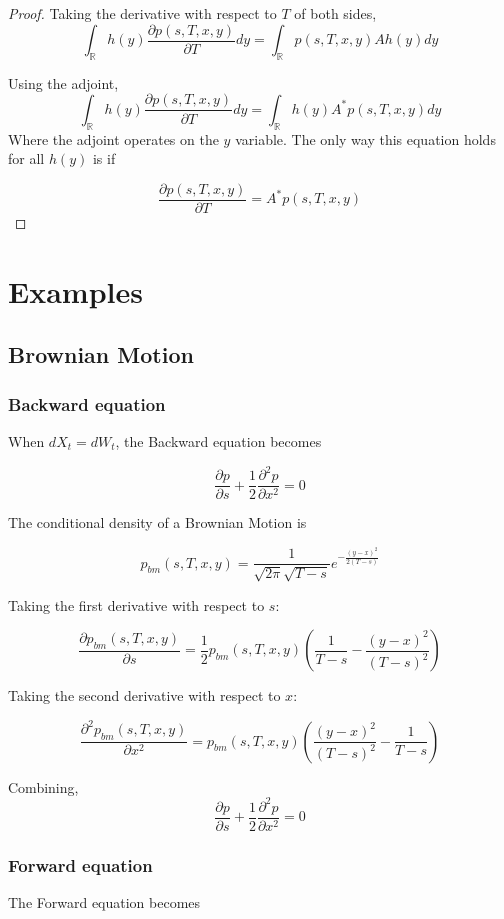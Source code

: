 \documentclass{article}
\theoremstyle{definition}
\begin{document}
\begin{proof}
	Taking the derivative with respect to \(T\) of both sides,
	\[\int_\mathbb{R} h(y) \frac{\partial p(s, T, x, y)}{\partial T} dy = \int_\mathbb{R}  p(s, T, x, y) A h(y) dy   \]
	
	Using the adjoint,
	\[\int_\mathbb{R} h(y) \frac{\partial p(s, T, x, y)}{\partial T} dy= \int_\mathbb{R}  h(y) A^* p(s, T, x, y) dy  \]
	Where the adjoint operates on the \(y\) variable.  The only way this equation holds for all \(h(y)\) is if 
	
	\[\frac{\partial p(s, T, x, y)}{\partial T} = A^* p(s, T, x, y)  \]
	
	
\end{proof}

\section{Examples}

\subsection{Brownian Motion}
\subsubsection{Backward equation}
When \(dX_t=dW_t\), the Backward equation becomes

\[\frac{\partial p} {\partial s} + \frac{1}{2} \frac{\partial^2 p}{\partial x^2} =0\]

The conditional density of a Brownian Motion is

\[p_{bm}(s, T, x, y)=\frac{1}{\sqrt{2\pi} \sqrt{T-s}} e^{-\frac{(y-x)^2}{2(T-s)}} \]

Taking the first derivative with respect to \(s\):

\[\frac{\partial p_{bm}(s, T, x, y)}{\partial s}=  \frac{1}{2}p_{bm}(s, T, x, y)\left(\frac{1}{T-s}-\frac{(y-x)^2}{(T-s)^2}\right)  \]

Taking the second derivative with respect to \(x\):

\[\frac{\partial^2 p_{bm}(s, T, x, y)}{\partial x^2}=  p_{bm}(s, T, x, y)\left(\frac{(y-x)^2}{(T-s)^2}-\frac{1}{T-s}\right)  \]

Combining,
\[\frac{\partial p} {\partial s} + \frac{1}{2} \frac{\partial^2 p}{\partial x^2} =0\]
\subsubsection{Forward equation}
The Forward equation becomes
\end{document}
